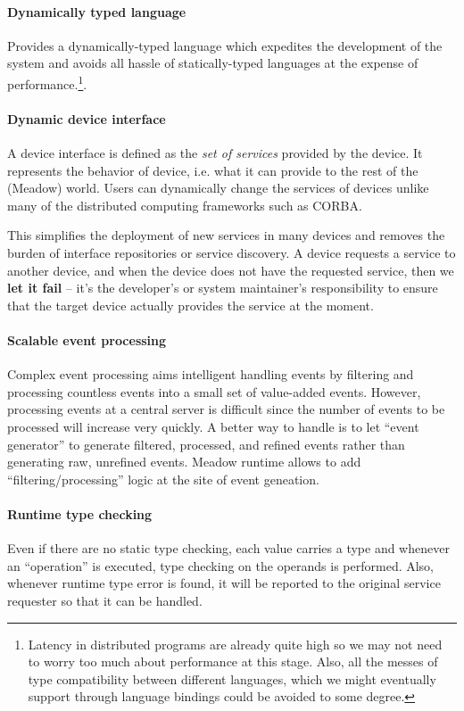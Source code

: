 \documentclass{note}
\begin{document}
\paragraph{Dynamically typed language}
Provides a dynamically-typed language which expedites the development of
   the system and avoids all hassle of statically-typed languages at the 
   expense of performance.\footnote{Latency in distributed programs are
     already quite high so we may not need to worry too much about performance
    at this stage. Also, all the messes of type compatibility between
    different languages, which we might eventually support through language
    bindings could be avoided to some degree.}.

\paragraph{Dynamic device interface}
A device interface is defined as the {\em set of services\/}
provided by the device.
It represents the behavior of device, i.e. what it can provide to the rest of
the (Meadow) world. Users can dynamically change the services of devices
unlike many of the distributed computing frameworks such as CORBA. 

This
simplifies the deployment of new services in many devices and removes
the burden of interface repositories or service discovery. 
A device requests a service to another device, and when the device does not
have the requested service, then we \textcolor{blue2}{\bf{}let it fail} --
it's the developer's or system maintainer's responsibility to ensure that the
target device actually provides the service at the moment. 

\paragraph{Scalable event processing}
Complex event processing aims intelligent handling events by filtering and
processing countless events into a small set of value-added events.
However, processing events at a central server is difficult since the number
of events to be processed will increase very quickly. A better way to handle
is to let ``event generator'' to generate filtered, processed, and refined
events rather than generating raw, unrefined events. Meadow runtime allows to
add ``filtering/processing'' logic at the site of event geneation.

\paragraph{Runtime type checking}
Even if there are no static type checking, each value carries a type and
whenever an ``operation'' is executed, type checking on the operands is
performed. Also, whenever runtime type error is found, it will be reported to
the original service requester so that it can be handled.
\end{document}
